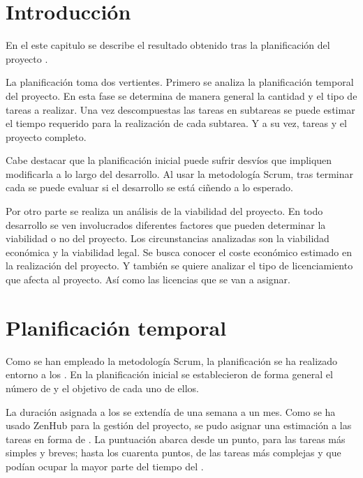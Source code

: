 \label{ch:plan}

\section{Introducción} \label{sec:plan-intro}
En el este capitulo se describe el resultado obtenido tras la planificación del
proyecto .

La planificación toma dos vertientes. Primero se analiza la planificación 
temporal del proyecto. En esta fase se determina de manera general la cantidad
y el tipo de tareas a realizar. Una vez descompuestas las tareas en subtareas
se puede estimar el tiempo requerido para la realización de cada subtarea.
Y a su vez, tareas y el proyecto completo.

Cabe destacar que la planificación inicial puede sufrir desvíos que impliquen
modificarla a lo largo del desarrollo. Al usar la metodología Scrum, tras
terminar cada  se puede evaluar si el desarrollo se está
ciñendo a lo esperado.

Por otro parte se realiza un análisis de la viabilidad del proyecto. En todo
desarrollo se ven involucrados diferentes factores que pueden determinar la
viabilidad o no del proyecto. Los circunstancias analizadas son la viabilidad
económica y la viabilidad legal. Se busca conocer el coste económico estimado
en la realización del proyecto. Y también se quiere analizar el tipo de
licenciamiento  que afecta al proyecto. Así como las
licencias que se van a asignar.

\section{Planificación temporal} \label{sec:plan-temporal}

Como se han empleado la metodología Scrum, la planificación se ha realizado
entorno a los . En la planificación inicial se
establecieron de forma general el número de  y el
objetivo de cada uno de ellos.

La duración asignada a los  se extendía de una semana a un
mes. Como se ha usado ZenHub para la gestión del proyecto, se pudo asignar una
estimación a las tareas en forma de .
La puntuación abarca desde un punto, para las tareas más simples y breves;
hasta los cuarenta puntos, de las tareas más complejas y que podían ocupar la
mayor parte del tiempo del .

